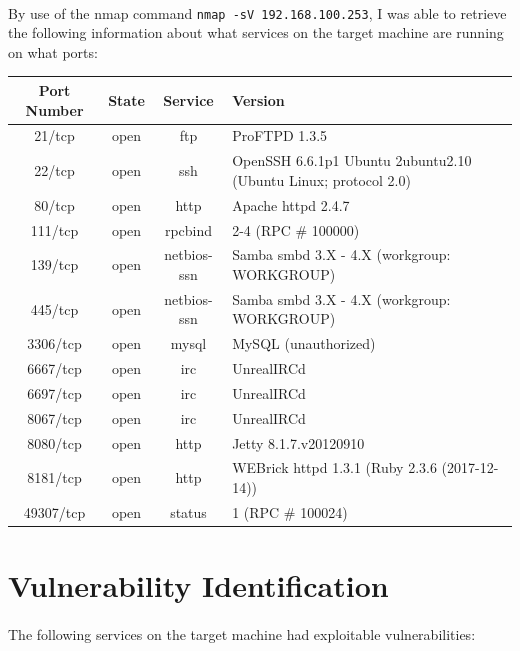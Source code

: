 \documentclass{article}
\begin{document}
\paragraph{}
By use of the nmap command \texttt{nmap -sV 192.168.100.253}, I was able to retrieve the following information about what services on the target machine are running on what ports:
\newline
\newline

\begin{adjustwidth}{-2cm}{}
\begin{tabular}{ |c|c|c|l| }
\hline
Port Number & State & Service & Version \\
\hline
21/tcp & open & ftp & ProFTPD 1.3.5 \\
\hline
22/tcp & open & ssh & OpenSSH 6.6.1p1 Ubuntu 2ubuntu2.10 (Ubuntu Linux; protocol 2.0) \\
\hline
80/tcp & open & http & Apache httpd 2.4.7 \\
\hline
111/tcp & open & rpcbind & 2-4 (RPC \# 100000) \\
\hline
139/tcp & open & netbios-ssn & Samba smbd 3.X - 4.X (workgroup: WORKGROUP) \\
\hline
445/tcp & open & netbios-ssn & Samba smbd 3.X - 4.X (workgroup: WORKGROUP) \\
\hline
3306/tcp & open & mysql & MySQL (unauthorized) \\
\hline
6667/tcp & open & irc & UnrealIRCd \\
\hline
6697/tcp & open & irc & UnrealIRCd \\
\hline
8067/tcp & open & irc & UnrealIRCd \\
\hline
8080/tcp & open & http & Jetty 8.1.7.v20120910 \\
\hline
8181/tcp & open & http & WEBrick httpd 1.3.1 (Ruby 2.3.6 (2017-12-14)) \\
\hline
49307/tcp & open & status & 1 (RPC \# 100024) \\
\hline
\end{tabular}
\end{adjustwidth}

\newpage

\section{Vulnerability Identification}
\label{sec:vulnerability_identification}
\paragraph{}
The following services on the target machine had exploitable vulnerabilities:
\end{document}
